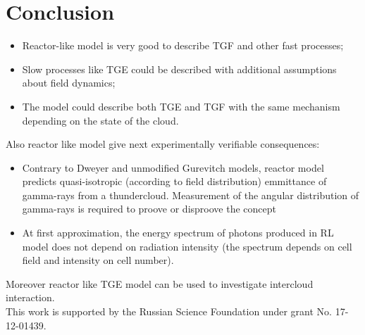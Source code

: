 \documentclass[utf8]{webofc}
\begin{document}
    \section{Conclusion}
    \begin{itemize}
    	\item Reactor-like model is very good to describe TGF and other fast processes;
    	\item Slow processes like TGE could be described with additional assumptions about field dynamics;
    	\item The model could describe both TGE and TGF with the same mechanism depending on the state of the cloud.
    \end{itemize}
Also reactor like model give next experimentally verifiable consequences:
    \begin{itemize}
    	\item Contrary to Dweyer and unmodified Gurevitch models, reactor model predicts quasi-isotropic (according to field distribution) emmittance of gamma-rays from a thundercloud.  	Measurement of the angular distribution of gamma-rays is required to proove or disproove the concept
    	
    	\item At first approximation, the energy spectrum of photons produced in RL model does not depend on radiation intensity (the spectrum depends on cell field and intensity on cell number).
    \end{itemize}
Moreover reactor like TGE model can be used to investigate intercloud interaction.
\\
This work is supported by the Russian Science Foundation under grant No. 17-12-01439.
    
    {}
\end{document}
